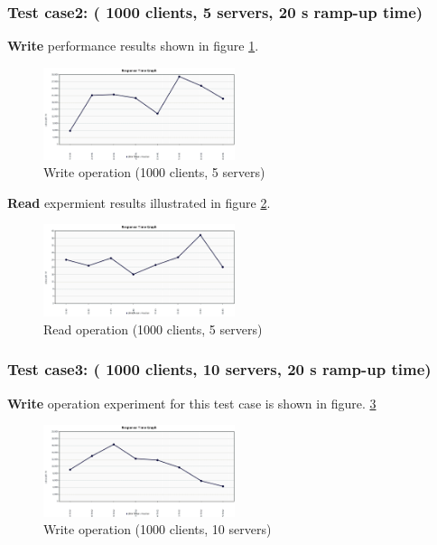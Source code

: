 \documentclass{sig-alternate}
\begin{document}
\subsubsection{Test case2: ( 1000 clients, 5 servers, 20 s ramp-up time)}
 \textbf{Write} performance results shown in figure \ref{put_5_1000}.
 \begin{center}
\begin{figure}[ht!]
\centering
     \includegraphics[width=0.5\textwidth]{put_5_1000_response.png}
\caption{Write operation (1000 clients, 5 servers) \label{put_5_1000}}
\end{figure}
\end{center}
 \textbf{Read} expermient results illustrated in figure \ref{get_5_1000}.
 \begin{center}
\begin{figure}[ht!]
\centering
     \includegraphics[width=0.5\textwidth]{get_5_1000_response.png}
\caption{Read operation (1000 clients, 5 servers) \label{get_5_1000}}
\end{figure}
\end{center}
\subsubsection{Test case3: ( 1000 clients, 10 servers, 20 s ramp-up time)}
 \textbf{Write} operation experiment for this test case is shown in figure. \ref{put_10_1000}
 \begin{center}
\begin{figure}[ht!]
\centering
     \includegraphics[width=0.5\textwidth]{put_10_1000_response.png}
\caption{Write operation (1000 clients, 10 servers) \label{put_10_1000}}
\end{figure}
\end{center}
\end{document}

